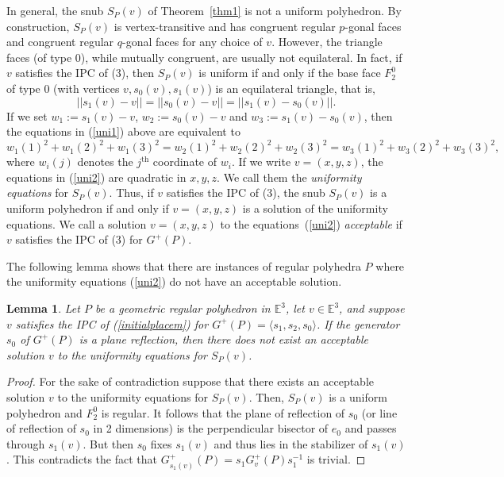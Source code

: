 \documentclass[12pt]{article}
\newtheorem{lemma}[theorem]{Lemma}
\theoremstyle{definition}\newtheorem{definition}{Definition}[section]
\begin{document}
In general, the snub $S_P(v)$ of Theorem~\ref{thm1} is not a uniform polyhedron. By construction, $S_P(v)$ is vertex-transitive and has congruent regular $p$-gonal faces and congruent regular $q$-gonal faces for any choice of $v$. However, the triangle faces (of type 0), while mutually congruent, are usually not equilateral. In fact, if $v$ satisfies the IPC of (3), then ${S}_P(v)$ is uniform if and only if the base face $F_2^0$ of type 0 (with vertices $v, s_0(v),s_1(v)$) is an equilateral triangle, that is, 
\begin{equation}
\label{uni1}
||s_1(v)-v|| = ||s_0(v)-v|| = ||s_1(v)-s_0(v)||.
\end{equation}
If we set $w_1 := s_1(v)-v$, $w_2 := s_0(v)-v$ and $w_3 := s_1(v)-s_0(v)$, then the equations in (\ref{uni1}) above are equivalent to 
\begin{equation}
\label{uni2}
w_1(1)^2+w_1(2)^2+w_1(3)^2 = w_2(1)^2+w_2(2)^2+w_2(3)^2 = w_3(1)^2+w_3(2)^2+w_3(3)^2,
\end{equation}
where $w_i(j)$ denotes the $j^{\text{th}}$ coordinate of $w_i$. If we write $v=(x,y,z)$, the equations in (\ref{uni2}) are quadratic in $x,y,z$. We call them the \textit{uniformity equations} for ${S}_P(v)$. Thus, if $v$ satisfies the IPC of (3), the snub ${S}_P(v)$ is a uniform polyhedron if and only if $v=(x,y,z)$ is a solution of the uniformity equations. We call a solution $v=(x,y,z)$ to the equations~(\ref{uni2}) \textit{acceptable} if $v$ satisfies the IPC of (3) for $G^+(P)$.
\smallskip

The following lemma shows that there are instances of regular polyhedra $P$ where the uniformity equations (\ref{uni2}) do not have an acceptable solution. 

\begin{lemma}
\label{lemma: uniformity conditions}
Let $P$ be a geometric regular polyhedron in $\mathbb{E}^3$, let $v\in\mathbb{E}^3$, and suppose $v$ satisfies the IPC of (\ref{initialplacem}) for $G^+(P)=\langle s_1,s_2,s_0\rangle$. If the generator $s_0$ of $G^{+}(P)$ is a plane reflection, then there does not exist an acceptable solution $v$ to the uniformity equations for ${S}_P(v)$.  
\end{lemma}

\begin{proof}
For the sake of contradiction suppose that there exists an acceptable solution $v$ to the uniformity equations for $S_P(v)$. Then, ${S}_P(v)$ is a uniform polyhedron and $F_2^0$ is regular. It follows that the plane of reflection of $s_0$ (or line of reflection of $s_0$ in 2 dimensions) is the perpendicular bisector of $e_0$ and passes through $s_1(v)$. But then $s_0$ fixes $s_1(v)$ and thus lies in the  stabilizer of $s_1(v)$. This contradicts the fact that $G^{+}_{s_1(v)}(P) = s_1 G^{+}_v(P) s_1^{-1}$ is trivial.  
\end{proof}
\end{document}

